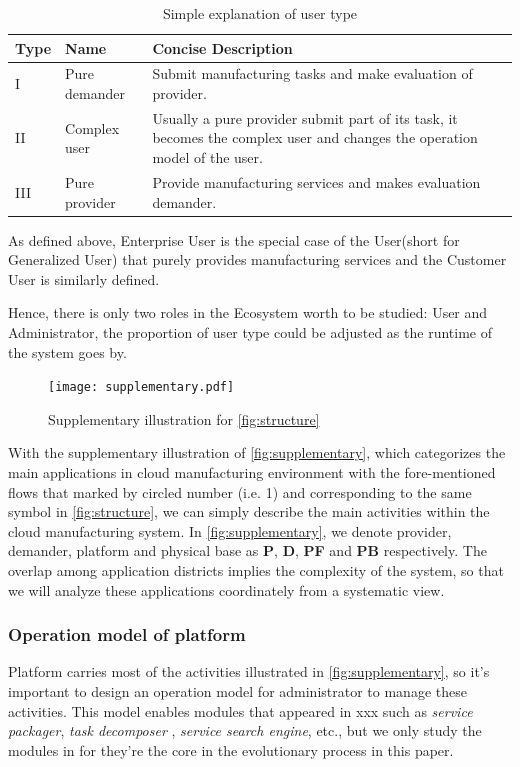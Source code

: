 \begin{table}[htbp]
	\caption{Simple explanation of user type}
	\label{tab:usertype}
	\centering

	\begin{tabularx}{\textwidth}{llX}
	\toprule
	\textbf{Type} & \textbf{Name} &  \textbf{Concise Description}\\
	\midrule
	I			& Pure demander &  Submit manufacturing tasks and make evaluation of provider.\\
	II 			& Complex user 	&  Usually a pure provider submit part of its task, it becomes the complex user and changes the operation model of the user.\\
	III 		& Pure provider &  Provide manufacturing services and makes evaluation demander.\\
	\bottomrule
	\end{tabularx}
\end{table}

As defined above, Enterprise User is the special case of the User(short for Generalized User) that purely provides manufacturing services and the Customer User is similarly defined.

Hence, there is only two roles in the Ecosystem worth to be studied: User and Administrator, the proportion of user type could be adjusted as the runtime of the system goes by.

\begin{figure}[htbp]
\centering
\texttt{[image: supplementary.pdf]}
\caption{Supplementary illustration for \autoref{fig:structure}}
\label{fig:supplementary}
\end{figure}

With the supplementary illustration of \autoref{fig:supplementary}, which categorizes the main applications in cloud manufacturing environment with the fore-mentioned flows that marked by circled number (i.e. \textcircled{\small{1}}) and corresponding to the same symbol in \autoref{fig:structure}, we can simply describe the main activities within the cloud manufacturing system. In \autoref{fig:supplementary}, we denote provider, demander, platform and physical base as \textbf{P}, \textbf{D}, \textbf{PF} and \textbf{PB} respectively. The overlap among application districts implies the complexity of the system, so that we will analyze these applications coordinately from a systematic view.

\subsubsection{Operation model of platform}
\label{ssub:operation_model_of_platform}
Platform carries most of the activities illustrated in \autoref{fig:supplementary}, so it's important to design an operation model for administrator to manage these activities. This model enables modules that appeared in xxx such as \textit{service packager}, \textit{task decomposer} , \textit{service search engine}, etc., but we only study the modules in for they're the core in the evolutionary process in this paper.

